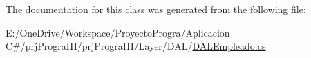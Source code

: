 The documentation for this class was generated from the following file\+:\begin{DoxyCompactItemize}
\item 
E\+:/\+One\+Drive/\+Workspace/\+Proyecto\+Progra/\+Aplicacion C\#/prj\+Progra\+I\+I\+I/prj\+Progra\+I\+I\+I/\+Layer/\+D\+A\+L/\hyperlink{_d_a_l_empleado_8cs}{D\+A\+L\+Empleado.\+cs}\end{DoxyCompactItemize}

